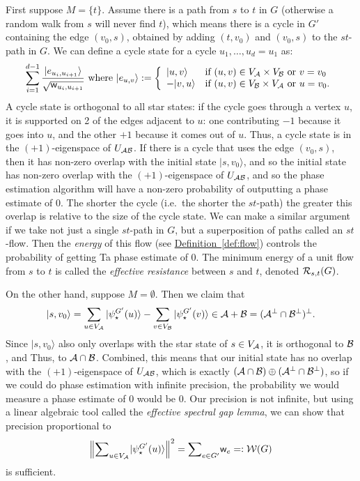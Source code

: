 \documentclass{article}
\newcommand{\defin}[1]{\hyperref[def:#1]{Definition~\ref*{def:#1}}}
\def\ket#1{{\lvert}#1\rangle}
\renewcommand{\>}{\rangle}
\newcommand{\<}{\langle}
\renewcommand{\(}{\left(}
\renewcommand{\)}{\right)}
\def\norm#1{\left\| #1 \right\|}
\def\w{{\sf w}}
\begin{document}
First suppose $M=\{t\}$. Assume there is a path from $s$ to $t$ in $G$ (otherwise a random walk from $s$ will never find $t$), which means there is a cycle in $G'$ containing the edge $(v_0,s)$, obtained by adding $(t,v_0)$ and $(v_0,s)$ to the $st$-path in $G$. We can define a cycle state for a cycle $u_1,\dots,u_d=u_1$ as:
$$\sum_{i=1}^{d-1}\frac{\ket{e_{u_i,u_{i+1}}}}{\sqrt{\w_{u_i,u_{i+1}}}}
\mbox{ where }
\ket{e_{u,v}}:= \left\{\begin{array}{ll}
\ket{u,v} & \mbox{if }(u,v)\in V_{\cal A}\times V_{\cal B}\mbox{ or }v=v_0\\
-\ket{v,u} & \mbox{if }(u,v)\in V_{\cal B}\times V_{\cal A}\mbox{ or }u=v_0.
\end{array}\right.$$
A cycle state is orthogonal to all star states: if the cycle goes through a vertex $u$, it is supported on 2 of the edges adjacent to $u$: one contributing $-1$ because it goes into $u$, and the other $+1$ because it comes out of $u$. Thus, a cycle state is in the $(+1)$-eigenspace of $U_{\cal AB}$. 
If there is a cycle that uses the edge $(v_0,s)$, then it has non-zero overlap with the initial state $\ket{s,v_0}$, and so the initial state has non-zero overlap with the $(+1)$-eigenspace of $U_{\cal AB}$, and so the phase estimation algorithm will have a non-zero probability of outputting a phase estimate of 0. The shorter the cycle (i.e.~the shorter the $st$-path) the greater this overlap is relative to the size of the cycle state. We can make a similar argument if we take not just a single $st$-path in $G$, but a superposition of paths called an $st$-flow. Then the \emph{energy} of this flow (see \defin{flow}) controls the probability of getting Ta phase estimate of 0. The minimum energy of a unit flow from $s$ to $t$ is called the \emph{effective resistance} between $s$ and $t$, denoted ${\cal R}_{s,t}(G)$.

On the other hand, suppose $M=\emptyset$. Then we claim that 
$$\ket{s,v_0} = \sum_{u\in V_{\cal A}}\ket{\psi_\star^{G'}(u)} - \sum_{v\in V_{\cal B}}\ket{\psi_\star^{G'}(v)}\in {\cal A}+{\cal B} = ({\cal A}^\bot\cap {\cal B}^\bot)^\bot.$$
Since $\ket{s,v_0}$ also only overlaps with the star state of $s \in V_{\cal A}$, it is orthogonal to ${\cal B}$, and Thus, to ${\cal A}\cap {\cal B}$. Combined, this means that our initial state has no overlap with the $(+1)$-eigenspace of $U_{\cal AB}$, which is exactly $({\cal A}\cap{\cal B})\oplus ({\cal A}^\bot\cap {\cal B}^\bot)$, so if we could do phase estimation with infinite precision, the probability we would measure a phase estimate of 0 would be 0. Our precision is not infinite, but using a linear algebraic tool called the \emph{effective spectral gap lemma}, we can show that precision proportional to
$$\textstyle\norm{{\displaystyle\sum}_{u\in V_{\cal A}}\ket{\psi_\star^{G'}(u)}}^2 = {\displaystyle\sum}_{e\in G'}\w_e=:{\cal W}(G)$$
is sufficient. 
\end{document}
